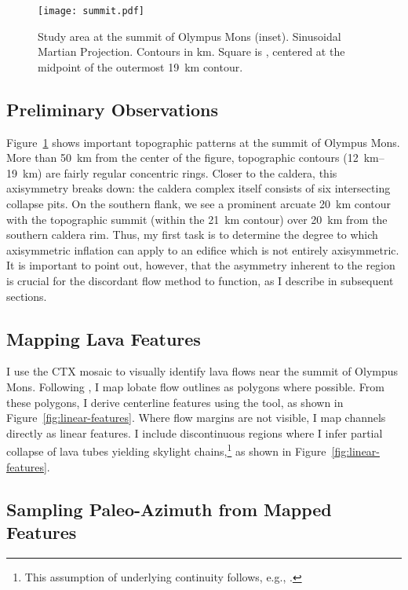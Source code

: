 \begin{figure}
    \centering
    \texttt{[image: summit.pdf]}
    \caption[Summit study area]{Study area at the summit of Olympus Mons (inset). Sinusoidal Martian Projection. Contours in \unit{km}. Square is , centered at the midpoint of the outermost \qty{19}{\km} contour.}\label{fig:summit}
\end{figure}

\subsection{Preliminary Observations}

Figure~\ref{fig:summit} shows important topographic patterns at the summit of Olympus Mons. More than \qty{50}{\km} from the center of the figure, topographic contours (\qtyrange{12}{19}{\km}) are fairly regular concentric rings. Closer to the caldera, this axisymmetry breaks down: the caldera complex itself consists of six intersecting collapse pits. On the southern flank, we see a prominent arcuate \qty{20}{\km} contour with the topographic summit (within the \qty{21}{\km} contour) over \qty{20}{\km} from the southern caldera rim. Thus, my first task is to determine the degree to which axisymmetric inflation can apply to an edifice which is not entirely axisymmetric. It is important to point out, however, that the asymmetry inherent to the region is crucial for the discordant flow method to function, as I describe in subsequent sections. 

\subsection{Mapping Lava Features}

I use the \ac{CTX} mosaic to visually identify lava flows near the summit of Olympus Mons. Following \textcite{mouginis-mark_geologic_2021}, I map lobate flow outlines as polygons where possible. From these polygons, I derive centerline features using the  tool, as shown in Figure~\ref{fig:linear-features}. Where flow margins are not visible, I map channels directly as linear features. I include discontinuous regions where I infer partial collapse of lava tubes yielding skylight chains,\footnote{This assumption of underlying continuity follows, e.g., \textcite{bleacher_olympus_2007,carr_geologic_2010,peters_lava_2021}.} as shown in Figure~\ref{fig:linear-features}.

\subsection{Sampling Paleo-Azimuth from Mapped Features}

